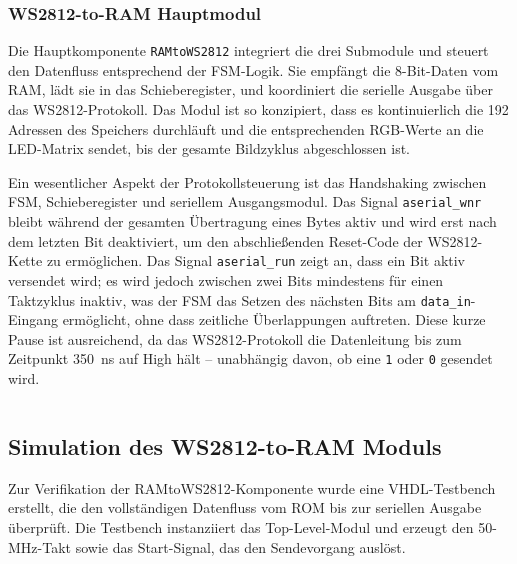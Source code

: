 \inputminted[linenos,frame=single,fontsize=\footnotesize]{vhdl}{A8_Abgabe/rtl/shiftregister.vhd}

\subsubsection{WS2812-to-RAM Hauptmodul}

Die Hauptkomponente \texttt{RAMtoWS2812} integriert die drei Submodule und steuert den Datenfluss entsprechend der FSM-Logik. Sie empfängt die 8-Bit-Daten vom RAM, lädt sie in das Schieberegister, und koordiniert die serielle Ausgabe über das WS2812-Protokoll. Das Modul ist so konzipiert, dass es kontinuierlich die 192 Adressen des Speichers durchläuft und die entsprechenden RGB-Werte an die LED-Matrix sendet, bis der gesamte Bildzyklus abgeschlossen ist.

Ein wesentlicher Aspekt der Protokollsteuerung ist das Handshaking zwischen FSM, Schieberegister und seriellem Ausgangsmodul. Das Signal \texttt{aserial\_wnr} bleibt während der gesamten Übertragung eines Bytes aktiv und wird erst nach dem letzten Bit deaktiviert, um den abschließenden Reset-Code der WS2812-Kette zu ermöglichen. Das Signal \texttt{aserial\_run} zeigt an, dass ein Bit aktiv versendet wird; es wird jedoch zwischen zwei Bits mindestens für einen Taktzyklus inaktiv, was der FSM das Setzen des nächsten Bits am \texttt{data\_in}-Eingang ermöglicht, ohne dass zeitliche Überlappungen auftreten. Diese kurze Pause ist ausreichend, da das WS2812-Protokoll die Datenleitung bis zum Zeitpunkt 350~ns auf High hält -- unabhängig davon, ob eine \texttt{1} oder \texttt{0} gesendet wird.

\inputminted[linenos,frame=single,fontsize=\footnotesize]{vhdl}{A8_Abgabe/rtl/RAMtoWS2812.vhd}

\subsection{Simulation des WS2812-to-RAM Moduls}

Zur Verifikation der RAMtoWS2812-Komponente wurde eine VHDL-Testbench erstellt, die den vollständigen Datenfluss vom ROM bis zur seriellen Ausgabe überprüft. Die Testbench instanziiert das Top-Level-Modul und erzeugt den 50-MHz-Takt sowie das Start-Signal, das den Sendevorgang auslöst.

\inputminted[linenos,frame=single,fontsize=\footnotesize]{vhdl}{A8_Abgabe/sim/RAMtoWS2812_tb.vhd}

